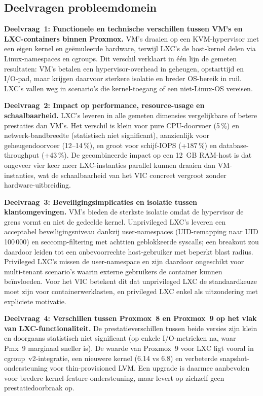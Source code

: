 \subsection*{Deelvragen probleemdomein}
\textbf{Deelvraag~1: Functionele en technische verschillen tussen VM's en LXC-containers binnen Proxmox.} VM's draaien op een KVM-hypervisor met een eigen kernel en geëmuleerde hardware, terwijl LXC's de host-kernel delen via Linux-namespaces en cgroups. Dit verschil verklaart in één lijn de gemeten resultaten: VM's betalen een hypervisor-overhead in geheugen, opstarttijd en I/O-pad, maar krijgen daarvoor sterkere isolatie en breder OS-bereik in ruil. LXC's vallen weg in scenario's die kernel-toegang of een niet-Linux-OS vereisen.

\textbf{Deelvraag~2: Impact op performance, resource-usage en schaalbaarheid.} LXC's leveren in alle gemeten dimensies vergelijkbare of betere prestaties dan VM's. Het verschil is klein voor pure CPU-doorvoer (5\,\%) en netwerk-bandbreedte (statistisch niet significant), aanzienlijk voor geheugendoorvoer (12--14\,\%), en groot voor schijf-IOPS (+187\,\%) en database-throughput (+43\,\%). De gecombineerde impact op een 12~GB RAM-host is dat ongeveer vier keer meer LXC-instanties parallel kunnen draaien dan VM-instanties, wat de schaalbaarheid van het VIC concreet vergroot zonder hardware-uitbreiding.

\textbf{Deelvraag~3: Beveiligingsimplicaties en isolatie tussen klantomgevingen.} VM's bieden de sterkste isolatie omdat de hypervisor de grens vormt en niet de gedeelde kernel. Unprivileged LXC's leveren een acceptabel beveiligingsniveau dankzij user-namespaces (UID-remapping naar UID 100\,000) en seccomp-filtering met achttien geblokkeerde syscalls; een breakout zou daardoor leiden tot een onbevoorrechte host-gebruiker met beperkt blast radius. Privileged LXC's missen de user-namespace en zijn daardoor ongeschikt voor multi-tenant scenario's waarin externe gebruikers de container kunnen beïnvloeden. Voor het VIC betekent dit dat unprivileged LXC de standaardkeuze moet zijn voor containerwerklasten, en privileged LXC enkel als uitzondering met expliciete motivatie.

\textbf{Deelvraag~4: Verschillen tussen Proxmox~8 en Proxmox~9 op het vlak van LXC-functionaliteit.} De prestatieverschillen tussen beide versies zijn klein en doorgaans statistisch niet significant (op enkele I/O-metrieken na, waar Pmx~9 marginaal sneller is). De waarde van Proxmox~9 voor LXC ligt vooral in cgroup~v2-integratie, een nieuwere kernel (6.14 vs 6.8) en verbeterde snapshot-ondersteuning voor thin-provisioned LVM. Een upgrade is daarmee aanbevolen voor bredere kernel-feature-ondersteuning, maar levert op zichzelf geen prestatiedoorbraak op.

